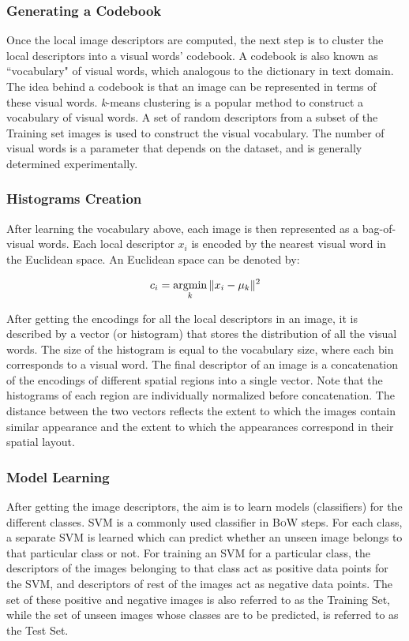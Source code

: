 \subsubsection{Generating a Codebook}
Once the local image descriptors are computed, the next step is to cluster the local descriptors into a visual words' codebook. A codebook is also known as ``vocabulary" of visual words, which analogous to the dictionary in text domain. The idea behind a codebook is that an image can be represented in terms of these visual words. \textit{k}-means clustering  is a popular method to construct a vocabulary of visual words. A set of random descriptors from a subset of the Training set images is used to construct the visual vocabulary. The number of visual words is a parameter that depends on the dataset, and is generally determined experimentally.

\subsubsection{Histograms Creation}
After learning the vocabulary above, each image is then represented as a bag-of-visual words. Each local descriptor $x_i$ is encoded by the nearest visual word in the Euclidean space. An Euclidean space can be denoted by:

\begin{equation}
c_i = \operatornamewithlimits{argmin}_k \|x_i - \mu_k\|^2
\end{equation}

After getting the encodings for all the local descriptors in an image, it is described by a vector (or histogram) that stores the distribution of all the visual words. The size of the histogram is equal to the vocabulary size, where each bin corresponds to a visual word. The final descriptor of an image is a concatenation of the encodings of different spatial regions into a single vector. Note that the histograms of each region are individually normalized before concatenation. The distance between the two vectors reflects the extent to which the images contain similar appearance and the extent to which the appearances correspond in their spatial layout.

\subsubsection{Model Learning}
After getting the image descriptors, the aim is to learn models (classifiers) for the different classes. \textsc{SVM} is a commonly used classifier in \textsc{BoW} steps. For each class, a separate SVM is learned which can predict whether an unseen image belongs to that particular class or not. For training an SVM for a particular class, the descriptors of the images belonging to that class act as positive data points for the SVM, and descriptors of rest of the
images act as negative data points. The set of these positive and negative images is also referred to as the Training Set, while the set of unseen images whose classes are to be predicted, is referred to as the Test Set.

